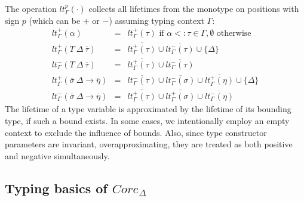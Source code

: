 \documentclass[11pt]{article}
\newcommand{\ap}{~}
\begin{document}
    The operation $lt_\Gamma^p(\cdot)$ collects all lifetimes from the monotype on positions with sign $p$ (which can be $+$ or $-$) assuming typing context $\Gamma$:
    \[
        \begin{array}{lll}
            lt_\Gamma^+(\alpha)                                       & = & lt_\Gamma^+(\tau) \text{ if } \alpha <: \tau \in \Gamma, \emptyset \text{ otherwise}                                     \\ %
            lt_\Gamma^+(T\ap\Delta\ap\overline{\tau})                 & = & \overline{lt_\Gamma^+(\tau)} \cup \overline{lt_\Gamma^-(\tau)} \cup \{\Delta\}                                           \\
            lt_\Gamma^-(T\ap\Delta\ap\overline{\tau})                 & = & \overline{lt_\Gamma^+(\tau)} \cup \overline{lt_\Gamma^-(\tau)}                                                           \\
            lt_\Gamma^{+}(\overline{\sigma}~\Delta\to\overline{\eta}) & = & \overline{lt_\Gamma^{-}(\tau)} \cup \overline{lt_\Gamma^{-}(\sigma)} \cup \overline{lt_\Gamma^{+}(\eta)} \cup \{\Delta\} \\
            lt_\Gamma^{-}(\overline{\sigma}~\Delta\to\overline{\eta}) & = & \overline{lt_\Gamma^{+}(\tau)} \cup \overline{lt_\Gamma^{+}(\sigma)} \cup \overline{lt_\Gamma^{-}(\eta)}
        \end{array}
    \]
    The lifetime of a type variable is approximated by the lifetime of its bounding type, if such a bound exists.
    In some cases, we intentionally employ an empty context to exclude the influence of bounds.
    Also, since type constructor parameters are invariant, overapproximating, they are treated as both positive and negative simultaneously. %

    \subsection{Typing basics of $Core_\Delta$}
\end{document}
